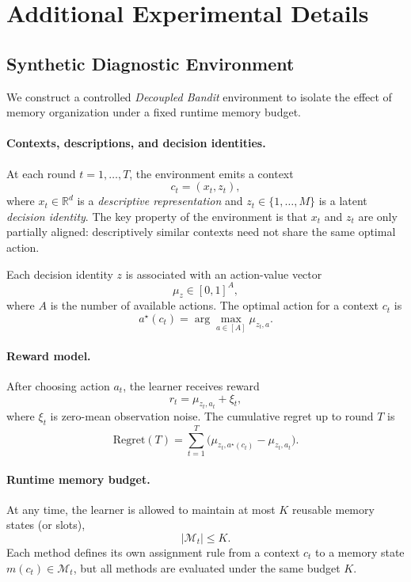 \documentclass{article}
\theoremstyle{plain}
\theoremstyle{definition}
\theoremstyle{remark}
\begin{document}
\section{Additional Experimental Details}
\label{app:exp-details}
\subsection{Synthetic Diagnostic Environment}
\label{app:synth}

We construct a controlled \emph{Decoupled Bandit} environment to isolate the effect of memory organization under a fixed runtime memory budget.

\paragraph{Contexts, descriptions, and decision identities.}
At each round \(t=1,\dots,T\), the environment emits a context
\[
c_t = (x_t, z_t),
\]
where \(x_t \in \mathbb{R}^d\) is a \emph{descriptive representation} and \(z_t \in \{1,\dots,M\}\) is a latent \emph{decision identity}. 
The key property of the environment is that \(x_t\) and \(z_t\) are only partially aligned: descriptively similar contexts need not share the same optimal action.

Each decision identity \(z\) is associated with an action-value vector
\[
\mu_z \in [0,1]^A,
\]
where \(A\) is the number of available actions. The optimal action for a context \(c_t\) is
\[
a^\star(c_t) = \arg\max_{a \in [A]} \mu_{z_t,a}.
\]

\paragraph{Reward model.}
After choosing action \(a_t\), the learner receives reward
\[
r_t = \mu_{z_t,a_t} + \xi_t,
\]
where \(\xi_t\) is zero-mean observation noise. The cumulative regret up to round \(T\) is
\[
\mathrm{Regret}(T) = \sum_{t=1}^{T} \bigl(\mu_{z_t,a^\star(c_t)} - \mu_{z_t,a_t}\bigr).
\]

\paragraph{Runtime memory budget.}
At any time, the learner is allowed to maintain at most \(K\) reusable memory states (or slots),
\[
|\mathcal{M}_t| \le K.
\]
Each method defines its own assignment rule from a context \(c_t\) to a memory state \(m(c_t)\in \mathcal{M}_t\), but all methods are evaluated under the same budget \(K\).
\end{document}
